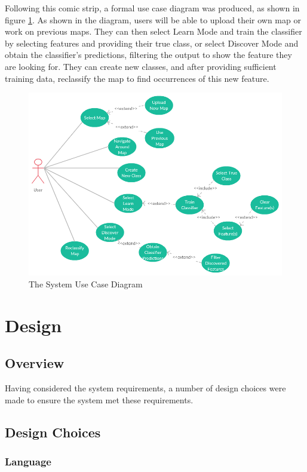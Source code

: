 Following this comic strip, a formal use case diagram was produced, as shown in figure \ref{fig:use_case_diagram}. As shown in the diagram, users will be able to upload their own map or work on previous maps. They can then select Learn Mode and train the classifier by selecting features and providing their true class, or select Discover Mode and obtain the classifier’s predictions, filtering the output to show the feature they are looking for. They can create new classes, and after providing sufficient training data, reclassify the map to find occurrences of this new feature.  
\begin{figure}[H]
    \centering
    \includegraphics[width=\textwidth]{figs/4/use_case_diagram}
    \caption{The System Use Case Diagram}
    \label{fig:use_case_diagram}
\end{figure}

\section{Design}
\subsection{Overview}
Having considered the system requirements, a number of design choices were made to ensure the system met these requirements. 
\subsection{Design Choices}
\subsubsection{Language}
